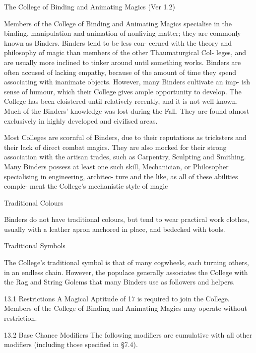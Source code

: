 \begin{Chapter}{The College of Binding and Animating Magics (Ver 1.2)}

Members of the College of Binding and Animating 
Magics specialise in the binding, manipulation and 
animation of nonliving matter; they are commonly 
known  as  Binders.  Binders  tend  to  be  less  con-
cerned  with  the  theory  and  philosophy  of  magic 
than  members  of  the  other  Thaumaturgical  Col-
leges,  and  are  usually  more  inclined  to  tinker 
around  until  something  works.  Binders  are  often 
accused of lacking empathy, because of the amount 
of  time  they  spend  associating  with  inanimate 
objects.  However,  many  Binders  cultivate  an  imp-
ish  sense  of  humour,  which  their  College  gives 
ample  opportunity  to  develop.  The  College  has 
been  cloistered  until  relatively  recently,  and  it  is 
not  well  known.  Much  of  the  Binders’  knowledge 
was  lost  during  the  Fall.  They  are  found  almost 
exclusively in highly developed and civilised areas. 

Most Colleges are scornful of Binders, due to their 
reputations  as  tricksters  and  their  lack  of  direct 
combat  magics.  They  are  also  mocked  for  their 
strong  association  with  the  artisan  trades,  such  as 
Carpentry,  Sculpting  and  Smithing.  Many  Binders 
possess  at  least  one  such  skill,  Mechanician,  or 
Philosopher  specialising  in  engineering,  architec-
ture  and  the  like,  as  all  of  these  abilities  comple-
ment the College’s mechanistic style of magic 

Traditional Colours 

Binders do not have traditional colours, but tend to 
wear practical work clothes, usually  with a leather 
apron anchored in place, and bedecked with tools. 

Traditional Symbols 

The  College’s  traditional  symbol  is  that  of  many 
cogwheels,  each  turning  others,  in  an  endless 
chain.  However,  the  populace  generally  associates 
the  College  with  the  Rag  and  String  Golems  that 
many Binders use as followers and helpers. 

13.1 Restrictions 
A  Magical  Aptitude  of  17  is  required  to  join  the 
College.  Members  of  the  College  of  Binding  and 
Animating Magics may operate without restriction. 

13.2 Base Chance Modifiers 
The  following  modifiers  are  cumulative  with  all 
other modifiers (including those specified in §7.4). 


\end{Chapter}

